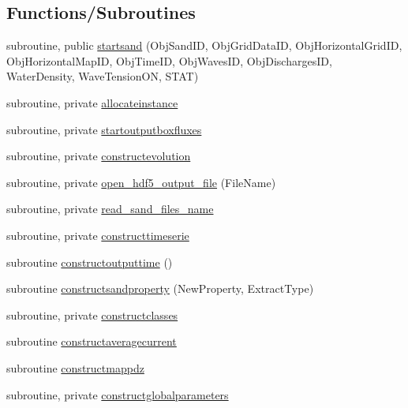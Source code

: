 \subsection*{Functions/\+Subroutines}
\begin{DoxyCompactItemize}
\item 
subroutine, public \mbox{\hyperlink{namespacemodulesand_a40b3b2fd3451026e5dc113c11bf6ad57}{startsand}} (Obj\+Sand\+ID, Obj\+Grid\+Data\+ID, Obj\+Horizontal\+Grid\+ID, Obj\+Horizontal\+Map\+ID, Obj\+Time\+ID, Obj\+Waves\+ID, Obj\+Discharges\+ID, Water\+Density, Wave\+Tension\+ON, S\+T\+AT)
\item 
subroutine, private \mbox{\hyperlink{namespacemodulesand_ad161b287427b9612e9e73f0e7cb2b2ec}{allocateinstance}}
\item 
subroutine, private \mbox{\hyperlink{namespacemodulesand_a26a45201fee3769e27ba13227a832a22}{startoutputboxfluxes}}
\item 
subroutine, private \mbox{\hyperlink{namespacemodulesand_a82762171a1b3adfea24df5d01e91490e}{constructevolution}}
\item 
subroutine, private \mbox{\hyperlink{namespacemodulesand_a508ae0cf41ca1a4046aa378241b38e19}{open\+\_\+hdf5\+\_\+output\+\_\+file}} (File\+Name)
\item 
subroutine, private \mbox{\hyperlink{namespacemodulesand_af5d461af239929ac66d30206f4a6d982}{read\+\_\+sand\+\_\+files\+\_\+name}}
\item 
subroutine, private \mbox{\hyperlink{namespacemodulesand_a32501716978e666f3e0a16150986c209}{constructtimeserie}}
\item 
subroutine \mbox{\hyperlink{namespacemodulesand_a0db362913d03be6c3ddaab19327561ce}{constructoutputtime}} ()
\item 
subroutine \mbox{\hyperlink{namespacemodulesand_a04230d24a80d765152f92115bc61d5c4}{constructsandproperty}} (New\+Property, Extract\+Type)
\item 
subroutine, private \mbox{\hyperlink{namespacemodulesand_a83a39e6e7dea7526131ca5a256383f63}{constructclasses}}
\item 
subroutine \mbox{\hyperlink{namespacemodulesand_a04e1a85e46e9df0c79bdc0d537788c96}{constructaveragecurrent}}
\item 
subroutine \mbox{\hyperlink{namespacemodulesand_a1fe3b75c21e01743ffaa043028b925b6}{constructmappdz}}
\item 
subroutine, private \mbox{\hyperlink{namespacemodulesand_a3f94338f096f34936302bce0d7d91189}{constructglobalparameters}}
\item 

\end{DoxyCompactItemize}
